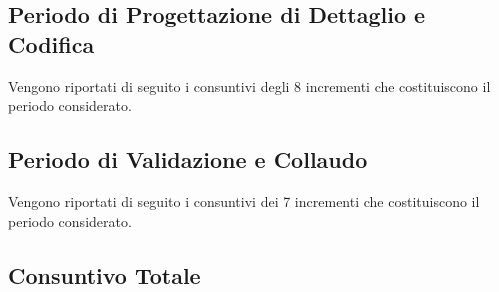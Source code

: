 \subsection{Periodo di Progettazione di Dettaglio e Codifica}
Vengono riportati di seguito i consuntivi degli 8 incrementi che costituiscono il periodo considerato.











\subsection{Periodo di Validazione e Collaudo}
Vengono riportati di seguito i consuntivi dei 7 incrementi che costituiscono il periodo considerato.









\subsection{Consuntivo Totale}

